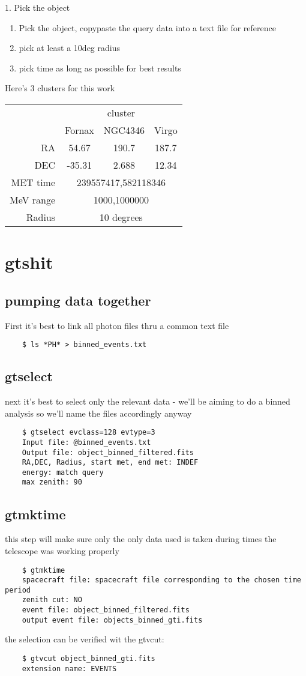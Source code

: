 \documentclass{article}
\begin{document}
1. Pick the object
\begin{enumerate}
	\item Pick the object, copypaste the query data into a text file for reference
	\item pick at least a 10deg radius
	\item pick time as long as possible for best results
\end{enumerate}
Here's 3 clusters for this work
   \begin{tabular}{rccc}
   	\firsthline
	   & \multicolumn{3}{c}{cluster}\\
	   & Fornax & NGC4346 & Virgo \\
	   \hline
	   RA & 54.67 & 190.7 & 187.7 \\
	   DEC & -35.31 & 2.688 & 12.34\\
	   MET time & \multicolumn{3}{c}{239557417,582118346}\\
	   MeV range & \multicolumn{3}{c}{1000,1000000}\\
	   Radius & \multicolumn{3}{c}{10 degrees}
   \end{tabular}
\section{gtshit}
\subsection{pumping data together}
First it's best to link all photon files thru a common text file
\begin{verbatim}
	$ ls *PH* > binned_events.txt
\end{verbatim}
\subsection{gtselect}
next it's best to select only the relevant data - we'll be aiming to do a binned analysis so we'll name the files accordingly anyway
\begin{verbatim}
    $ gtselect evclass=128 evtype=3
    Input file: @binned_events.txt
    Output file: object_binned_filtered.fits
    RA,DEC, Radius, start met, end met: INDEF
    energy: match query
    max zenith: 90
\end{verbatim}
\subsection{gtmktime}%
this step will make sure only the only data used is taken during times the telescope was working properly
\begin{verbatim}
    $ gtmktime
    spacecraft file: spacecraft file corresponding to the chosen time period
    zenith cut: NO
    event file: object_binned_filtered.fits
    output event file: objects_binned_gti.fits
\end{verbatim}
the selection can be verified wit the gtvcut:
\begin{verbatim}
    $ gtvcut object_binned_gti.fits
    extension name: EVENTS
\end{verbatim}
\end{document}
